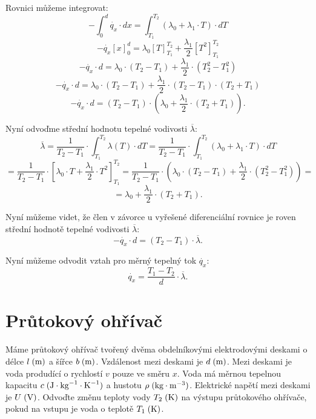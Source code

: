 \documentclass{article}
\begin{document}
Rovnici můžeme integrovat:
$$
    - \int_{0}^{d} \dot{q_x} \cdot dx = \int_{T_1}^{T_2} \left( \lambda_0 + \lambda_1 \cdot T \right) \cdot dT
$$
$$
    - \dot{q_x} \left[ x \right]_{0}^{d} = \lambda_0 \left[ T \right]_{T_1}^{T_2} + \frac{\lambda_1}{2} \left[ T^2 \right]_{T_1}^{T_2}
$$
$$
    - \dot{q_x} \cdot d = \lambda_0 \cdot (T_2 - T_1) + \frac{\lambda_1}{2} \cdot (T_2^2 - T_1^2)
$$
$$
    - \dot{q_x} \cdot d = \lambda_0 \cdot (T_2 - T_1) + \frac{\lambda_1}{2} \cdot (T_2 - T_1) \cdot (T_2 + T_1)
$$
$$
    - \dot{q_x} \cdot d = (T_2 - T_1) \cdot \left( \lambda_0 + \frac{\lambda_1}{2} \cdot (T_2 + T_1) \right).
$$

Nyní odvoďme střední hodnotu tepelné vodivosti $\overline{\lambda}$:
$$
    \overline{\lambda} = \frac{1}{T_2 - T_1} \cdot \int_{T_1}^{T_2} \lambda (T) \cdot dT = \frac{1}{T_2 - T_1} \cdot \int_{T_1}^{T_2} \left( \lambda_0 + \lambda_1 \cdot T \right) \cdot dT
$$
$$
    = \frac{1}{T_2 - T_1} \cdot \left[ \lambda_0 \cdot T + \frac{\lambda_1}{2} \cdot T^2 \right]_{T_1}^{T_2} = \frac{1}{T_2 - T_1} \cdot \left( \lambda_0 \cdot (T_2 - T_1) + \frac{\lambda_1}{2} \cdot (T_2^2 - T_1^2) \right) =
$$
$$
    = \lambda_0 + \frac{\lambda_1}{2} \cdot (T_2 + T_1).
$$

Nyní můžeme videt, že člen v závorce u vyřešené diferenciální rovnice je roven střední hodnotě tepelné vodivosti $\overline{\lambda}$:
$$
    - \dot{q_x} \cdot d = (T_2 - T_1) \cdot \overline{\lambda}.
$$

Nyní můžeme odvodit vztah pro měrný tepelný tok $\dot{q_x}$:
$$
    \dot{q_x} = \frac{T_1 - T_2}{d} \cdot \overline{\lambda}.
$$

\newpage




\section{ Průtokový ohřívač \spicy \spicy \spicy \spicy}

Máme průtokový ohřívač tvořený dvěma obdelníkovými elektrodovými deskami o délce $l \; (\textrm{m})$ a šířce $b \; (\textrm{m})$. Vzdálenost mezi deskami je $d \; (\textrm{m})$. Mezi deskami je voda produdící o rychlostí $v$ pouze ve směru $x$. Voda má měrnou tepelnou kapacitu $c \; (\textrm{J} \cdot \textrm{kg}^{-1} \cdot \textrm{K}^{-1})$ a hustotu $\rho \; (\textrm{kg} \cdot \textrm{m}^{-3})$. Elektrické napětí mezi deskami je $U \; (\textrm{V})$. Odvoďte změnu teploty vody $T_2 \; (\textrm{K})$ na výstupu průtokového ohřívače, pokud na vstupu je voda o teplotě $T_1 \; (\textrm{K})$.\\
\end{document}
